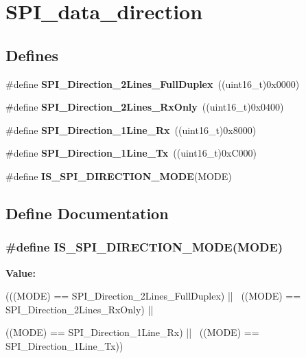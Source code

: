 \hypertarget{group__SPI__data__direction}{
\section{SPI\_\-data\_\-direction}
\label{group__SPI__data__direction}
}
\subsection*{Defines}
\begin{DoxyCompactItemize}
\item 
\hypertarget{group__SPI__data__direction_gab6bdb82e315a90210c4425c46bbdf5f1}{
\#define {\bfseries SPI\_\-Direction\_\-2Lines\_\-FullDuplex}~((uint16\_\-t)0x0000)}
\label{group__SPI__data__direction_gab6bdb82e315a90210c4425c46bbdf5f1}

\item 
\hypertarget{group__SPI__data__direction_gab8ab942f7240394f50e4c86c5288516a}{
\#define {\bfseries SPI\_\-Direction\_\-2Lines\_\-RxOnly}~((uint16\_\-t)0x0400)}
\label{group__SPI__data__direction_gab8ab942f7240394f50e4c86c5288516a}

\item 
\hypertarget{group__SPI__data__direction_ga42ea8306cfc1f23ffc51efae6f66320e}{
\#define {\bfseries SPI\_\-Direction\_\-1Line\_\-Rx}~((uint16\_\-t)0x8000)}
\label{group__SPI__data__direction_ga42ea8306cfc1f23ffc51efae6f66320e}

\item 
\hypertarget{group__SPI__data__direction_ga70cc710a771065b2ed11c2ac9697defe}{
\#define {\bfseries SPI\_\-Direction\_\-1Line\_\-Tx}~((uint16\_\-t)0xC000)}
\label{group__SPI__data__direction_ga70cc710a771065b2ed11c2ac9697defe}

\item 
\#define {\bfseries IS\_\-SPI\_\-DIRECTION\_\-MODE}(MODE)
\end{DoxyCompactItemize}


\subsection{Define Documentation}
\hypertarget{group__SPI__data__direction_ga536857c68ce1d9806c04046707448b3e}{
\subsubsection[{IS\_\-SPI\_\-DIRECTION\_\-MODE}]{\setlength{\rightskip}{0pt plus 5cm}\#define IS\_\-SPI\_\-DIRECTION\_\-MODE(MODE)}}
\label{group__SPI__data__direction_ga536857c68ce1d9806c04046707448b3e}
{\bfseries Value:}
\begin{DoxyCode}
(((MODE) == SPI_Direction_2Lines_FullDuplex) || \
                                     ((MODE) == SPI_Direction_2Lines_RxOnly) || \
      
                                     ((MODE) == SPI_Direction_1Line_Rx) || \
                                     ((MODE) == SPI_Direction_1Line_Tx))
\end{DoxyCode}
